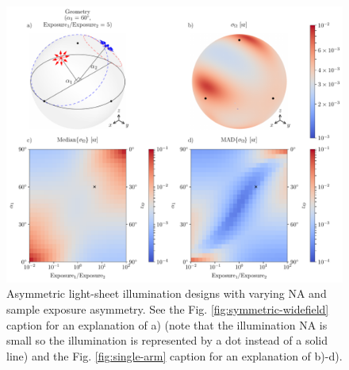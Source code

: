 \documentclass[10pt]{article}
\begin{document}
\begin{figure}[htbp]
  \centering\includegraphics[width=\textwidth]{asymmetric-double}
  \caption{Asymmetric light-sheet illumination designs with varying NA and
    sample exposure asymmetry. See the Fig. \ref{fig:symmetric-widefield}
    caption for an explanation of a) (note that the illumination NA is small so
    the illumination is represented by a dot instead of a solid line) and the
    Fig. \ref{fig:single-arm} caption for an explanation of b)-d).}
\label{fig:asymmetric-double}
\end{figure}


\end{document}
